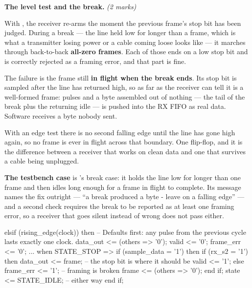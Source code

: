 \textbf{The level test and the break.} \textit{(2 marks)}

With , the receiver re-arms the moment the previous frame's stop bit has
been judged. During a break --- the line held low for longer than a frame, which is what a
transmitter losing power or a cable coming loose looks like --- it marches through back-to-back
\textbf{all-zero frames}. Each of those ends on a low stop bit and is correctly rejected as a framing
error, and that part is fine.

The failure is the frame still \textbf{in flight when the break ends}. Its stop bit is sampled after
the line has returned high, so as far as the receiver can tell it is a well-formed frame:
 pulses and a byte assembled out of nothing --- the tail of the break plus the returning
idle --- is pushed into the RX FIFO as real data. Software receives a byte nobody sent.

With an edge test there is no second falling edge until the line has gone high again, so no frame is
ever in flight across that boundary. One flip-flop, and it is the difference between a receiver that
works on clean data and one that survives a cable being unplugged.

\textbf{The testbench case} is 's break case: it holds the line low for longer than
one frame and then idles long enough for a frame in flight to complete. Its message names the fix
outright --- ``a break produced a byte - leave  on a falling edge'' --- and a
second check requires the break to be reported as at least one framing error, so a receiver that goes
silent instead of wrong does not pass either.

\begin{vhdlcode}
    elsif (rising_edge(clock)) then
        -- Defaults first: any pulse from the previous cycle lasts exactly one clock.
        data_out  <= (others => '0');
        valid     <= '0';
        frame_err <= '0';
        ...
            when STATE_STOP =>
                if (sample_data = '1') then
                    if (rx_s2 = '1') then
                        data_out <= frame;      -- the stop bit is where it should be
                        valid    <= '1';
                    else
                        frame_err <= '1';       -- framing is broken
                        frame     <= (others => '0');
                    end if;
                    state <= STATE_IDLE;        -- either way
                end if;
\end{vhdlcode}

